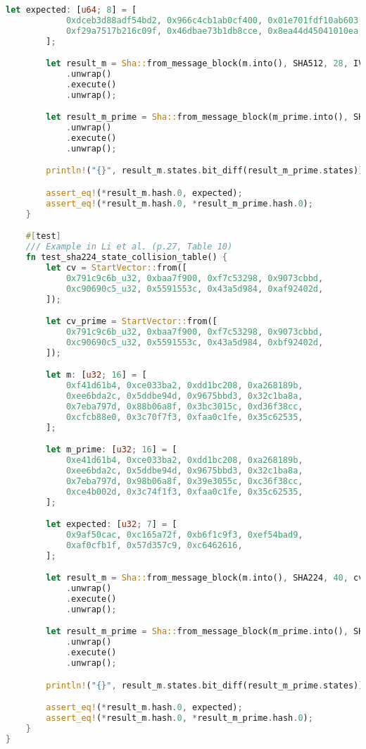 \begin{lstlisting}[language=rust, caption={verification/verification.rs}]
		let expected: [u64; 8] = [
			0xdceb3d88adf54bd2, 0x966c4cb1ab0cf400, 0x01e701fdf10ab603, 0x796d6e5028a5e89a,
			0xf29a7517b216c09f, 0x46dbae73b1db8cce, 0x8ea44d45041010ea, 0x26a7a6b902f2632f,
		];

		let result_m = Sha::from_message_block(m.into(), SHA512, 28, IV)
			.unwrap()
			.execute()
			.unwrap();

		let result_m_prime = Sha::from_message_block(m_prime.into(), SHA512, 28, IV)
			.unwrap()
			.execute()
			.unwrap();

		println!("{}", result_m.states.bit_diff(result_m_prime.states));

		assert_eq!(*result_m.hash.0, expected);
		assert_eq!(*result_m.hash.0, *result_m_prime.hash.0);
	}

	#[test]
	/// Example in Li et al. (p.27, Table 10)
	fn test_sha224_state_collision_table() {
		let cv = StartVector::from([
			0x791c9c6b_u32, 0xbaa7f900, 0xf7c53298, 0x9073cbbd,
			0xc90690c5_u32, 0x5591553c, 0x43a5d984, 0xaf92402d,
		]);

		let cv_prime = StartVector::from([
			0x791c9c6b_u32, 0xbaa7f900, 0xf7c53298, 0x9073cbbd,
			0xc90690c5_u32, 0x5591553c, 0x43a5d984, 0xbf92402d,
		]);

		let m: [u32; 16] = [
			0xf41d61b4, 0xce033ba2, 0xdd1bc208, 0xa268189b,
			0xee6bda2c, 0x5ddbe94d, 0x9675bbd3, 0x32c1ba8a,
			0x7eba797d, 0x88b06a8f, 0x3bc3015c, 0xd36f38cc,
			0xcfcb88e0, 0x3c70f7f3, 0xfaa0c1fe, 0x35c62535,
		];

		let m_prime: [u32; 16] = [
			0xe41d61b4, 0xce033ba2, 0xdd1bc208, 0xa268189b,
			0xee6bda2c, 0x5ddbe94d, 0x9675bbd3, 0x32c1ba8a,
			0x7eba797d, 0x98b06a8f, 0x39e3055c, 0xc36f38cc,
			0xce4b002d, 0x3c74f1f3, 0xfaa0c1fe, 0x35c62535,
		];

		let expected: [u32; 7] = [
			0x9af50cac, 0xc165a72f, 0xb6f1c9f3, 0xef54bad9,
			0xaf0cfb1f, 0x57d357c9, 0xc6462616,
		];

		let result_m = Sha::from_message_block(m.into(), SHA224, 40, cv)
			.unwrap()
			.execute()
			.unwrap();

		let result_m_prime = Sha::from_message_block(m_prime.into(), SHA224, 40, cv_prime)
			.unwrap()
			.execute()
			.unwrap();

		println!("{}", result_m.states.bit_diff(result_m_prime.states));

		assert_eq!(*result_m.hash.0, expected);
		assert_eq!(*result_m.hash.0, *result_m_prime.hash.0);
	}
}
\end{lstlisting}

